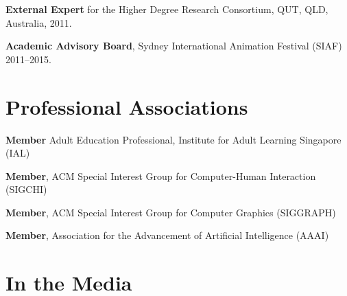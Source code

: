 \documentclass[10pt,a4paper]{article}
\renewenvironment{itemize}{
    \begin{list}{}{
            \setlength{\leftmargin}{1.5em}
            \setlength{\itemsep}{0.25em}
            \setlength{\parskip}{0pt}
            \setlength{\parsep}{0.25em}
        }
        }{
    \end{list}
}
\begin{document}
\begin{itemize}
    \item \textbf{External Expert} for the Higher Degree Research Consortium, QUT, QLD, Australia, 2011. %

    \item \textbf{Academic Advisory Board}, Sydney International Animation Festival (SIAF) 2011--2015.

\end{itemize}



\section*{Professional Associations}

\begin{itemize}

    \item \textbf{Member} Adult Education Professional, Institute for Adult Learning Singapore (IAL)

    \item \textbf{Member}, ACM Special Interest Group for Computer-Human Interaction (SIGCHI)

    \item \textbf{Member}, ACM Special Interest Group for Computer Graphics (SIGGRAPH)

    \item \textbf{Member}, Association for the Advancement of Artificial Intelligence (AAAI)

\end{itemize}



\section*{In the Media}
\end{document}
